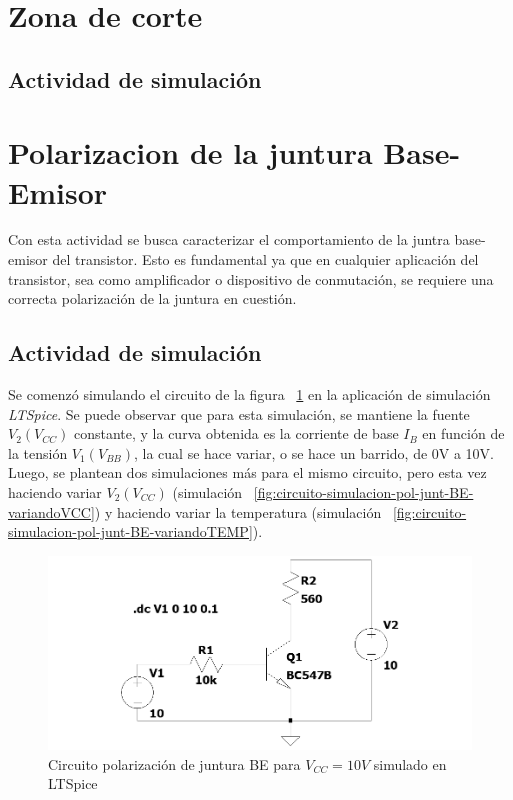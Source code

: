 \documentclass[chaptersright]{informeutn}
\begin{document}
\section{Zona de corte}
  \subsection{Actividad de simulación}

  \section{Polarizacion de la juntura Base-Emisor}
    Con esta actividad se busca caracterizar el comportamiento de la
    juntra base-emisor del transistor. Esto es fundamental ya que en
    cualquier aplicación del transistor, sea como amplificador o
    dispositivo de conmutación, se requiere una correcta polarización
    de la juntura en cuestión.
    
    \subsection{Actividad de simulación}
    Se comenzó simulando el circuito de la figura ~\ref{fig:circuito-simulacion-pol-junt-BE} en la aplicación de simulación
    \textit{LTSpice}. Se puede observar que para esta simulación, se
    mantiene la fuente $V_2 (V_{CC})$ constante, y la curva obtenida
    es la corriente de base $I_B$ en función de la tensión $V_1(V_{BB})$, la cual se hace variar, o se hace un barrido, de 0V a 10V.
    Luego, se plantean dos simulaciones más para el mismo circuito, 
    pero esta vez haciendo variar $V_2 (V_{CC})$ (simulación 
    ~\ref{fig:circuito-simulacion-pol-junt-BE-variandoVCC}) y haciendo
    variar la temperatura (simulación ~\ref{fig:circuito-simulacion-pol-junt-BE-variandoTEMP}).

    \begin{figure}[H]
        \centering
        \includegraphics[width=1\textwidth, keepaspectratio]{pictures/circuito-simulacion-pol-junt-BE.png}
        \caption{Circuito polarización de juntura BE para $V_{CC} = 10V$ simulado en LTSpice}
        \label{fig:circuito-simulacion-pol-junt-BE}
    \end{figure}
\end{document}
